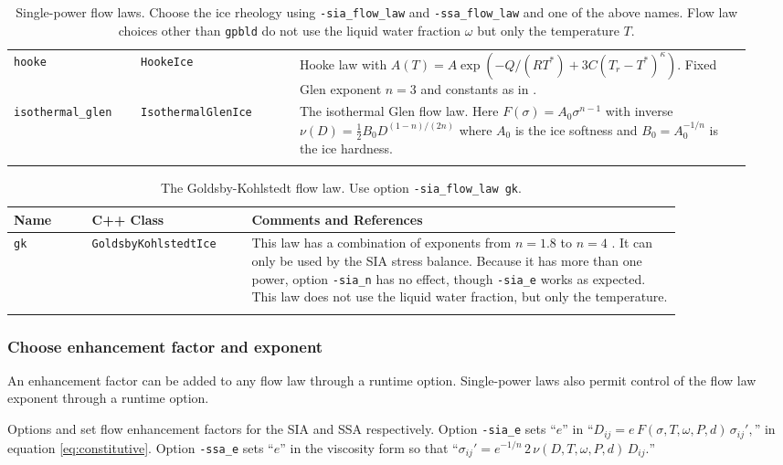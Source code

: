 \begin{table}[ht]
\begin{tabular}{p{0.16\linewidth}p{0.2\linewidth}p{0.58\linewidth}}
\texttt{hooke} & \texttt{HookeIce} & Hooke law with \mbox{$A(T) = A \exp(-Q/(RT^*) + 3C (T_r - T^*)^\kappa)$.}  Fixed Glen exponent $n=3$ and constants as in \cite{Hooke,PayneBaldwin}.\\
\texttt{isothermal_glen} &  \texttt{IsothermalGlenIce} & The isothermal Glen flow law.  Here $F(\sigma) = A_0 \sigma^{n-1}$ with inverse $\nu(D) = \frac{1}{2} B_0 D^{(1-n)/(2n)}$ where $A_0$ is the ice softness and $B_0=A_0^{-1/n}$ is the ice hardness. \\
\bottomrule
\normalsize	
\end{tabular}
\caption{Single-power flow laws.  Choose the ice rheology using \texttt{-sia_flow_law} and \texttt{-ssa_flow_law} and one of the above names.  Flow law choices other than \texttt{gpbld} do not use the liquid water fraction $\omega$ but only the temperature $T$.}
\label{tab:flowlaw}
\end{table}

\begin{table}[ht]
\centering
{}
\small
\begin{tabular}{p{0.1\linewidth}p{0.2\linewidth}p{0.55\linewidth}}\toprule
\textbf{Name} & C++ Class & \textbf{Comments and References} \\ \midrule
\texttt{gk} & \texttt{GoldsbyKohlstedtIce} & This law has a combination of exponents from $n=1.8$ to $n=4$ \cite{GoldsbyKohlstedt}.  It can only be used by the SIA stress balance.  Because it has more than one power, option \texttt{-sia_n} has no effect, though \texttt{-sia_e} works as expected.  This law does not use the liquid water fraction, but only the temperature. \\
\bottomrule
\normalsize	
\end{tabular}
\caption{The Goldsby-Kohlstedt flow law. Use option \texttt{-sia_flow_law gk}.}
\label{tab:flowlawgk}
\end{table}


\subsubsection*{Choose enhancement factor and exponent}  An enhancement factor can be added to any flow law through a runtime option.  Single-power laws also permit control of the flow law exponent through a runtime option.

Options  and  set flow enhancement factors for the SIA and SSA respectively.  Option \texttt{-sia_e} sets ``$e$'' in ``$D_{ij} = e\, F(\sigma,T,\omega,P,d)\, \sigma_{ij}',$'' in equation \eqref{eq:constitutive}.  Option \texttt{-ssa_e} sets ``$e$'' in the viscosity form so that ``$\sigma_{ij}'  = e^{-1/n}\, 2\, \nu(D,T,\omega,P,d)\, D_{ij}.$''

